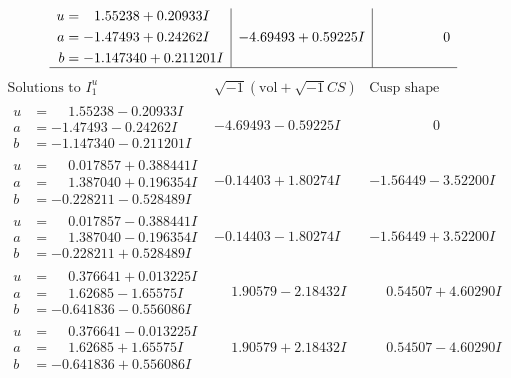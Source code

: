 \documentclass[1p]{elsarticle_modified}
\theoremstyle{definition}
\newcommand{\I}{\sqrt{-1}}
\begin{document}
$$\begin{array}{c|c|c}
\begin{aligned}
u &= \phantom{-}1.55238 + 0.20933 I \\
a &= -1.47493 + 0.24262 I \\
b &= -1.147340 + 0.211201 I\end{aligned}
 & -4.69493 + 0.59225 I & \phantom{-0.000000 } 0\\
 \hline 
 \end{array}$$\newpage$$\begin{array}{c|c|c}  
\text{Solutions to }I^u_{1}& \I (\text{vol} + \sqrt{-1}CS) & \text{Cusp shape}\\
 \hline 
\begin{aligned}
u &= \phantom{-}1.55238 - 0.20933 I \\
a &= -1.47493 - 0.24262 I \\
b &= -1.147340 - 0.211201 I\end{aligned}
 & -4.69493 - 0.59225 I & \phantom{-0.000000 } 0 \\ \hline\begin{aligned}
u &= \phantom{-}0.017857 + 0.388441 I \\
a &= \phantom{-}1.387040 + 0.196354 I \\
b &= -0.228211 - 0.528489 I\end{aligned}
 & -0.14403 + 1.80274 I & -1.56449 - 3.52200 I \\ \hline\begin{aligned}
u &= \phantom{-}0.017857 - 0.388441 I \\
a &= \phantom{-}1.387040 - 0.196354 I \\
b &= -0.228211 + 0.528489 I\end{aligned}
 & -0.14403 - 1.80274 I & -1.56449 + 3.52200 I \\ \hline\begin{aligned}
u &= \phantom{-}0.376641 + 0.013225 I \\
a &= \phantom{-}1.62685 - 1.65575 I \\
b &= -0.641836 - 0.556086 I\end{aligned}
 & \phantom{-}1.90579 - 2.18432 I & \phantom{-}0.54507 + 4.60290 I \\ \hline\begin{aligned}
u &= \phantom{-}0.376641 - 0.013225 I \\
a &= \phantom{-}1.62685 + 1.65575 I \\
b &= -0.641836 + 0.556086 I\end{aligned}
 & \phantom{-}1.90579 + 2.18432 I & \phantom{-}0.54507 - 4.60290 I \\ \hline\begin{aligned}

\end{aligned}
\end{array}$$
\end{document}
